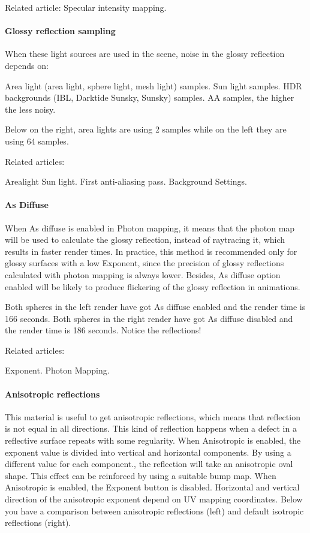 Related article: Specular intensity mapping.
\paragraph{Glossy reflection sampling}

When these light sources are used in the scene, noise in the glossy reflection depends on:

Area light (area light, sphere light, mesh light) samples.
Sun light samples.
HDR backgrounds (IBL, Darktide Sunsky, Sunsky) samples.
AA samples, the higher the less noisy.

Below on the right, area lights are using 2 samples while on the left they are using 64 samples.

Related articles:

Arealight
Sun light.
First anti-aliasing pass.
Background Settings.

\paragraph{As Diffuse}

When As diffuse is enabled in Photon mapping, it means that the photon map will be used to calculate the glossy reflection, instead of raytracing it, which results in faster render times. In practice, this method is recommended only for glossy surfaces with a low Exponent, since the precision of glossy reflections calculated with photon mapping is always lower. Besides, As diffuse option enabled will be likely to produce flickering of the glossy reflection in animations.

Both spheres in the left render have got As diffuse enabled and the render time is 166 seconds. Both spheres in the right render have got As diffuse disabled and the render time is 186 seconds. Notice the reflections!

Related articles:

Exponent.
Photon Mapping.

\paragraph{Anisotropic reflections}

This material is useful to get anisotropic reflections, which means that reflection is not equal in all directions. This kind of reflection happens when a defect in a reflective surface repeats with some regularity. When Anisotropic is enabled, the exponent value is divided into vertical and horizontal components. By using a different value for each component., the reflection will take an anisotropic oval shape. This effect can be reinforced by using a suitable bump map. When Anisotropic is enabled, the Exponent button is disabled. Horizontal and vertical direction of the anisotropic exponent depend on UV mapping coordinates. Below you have a comparison between anisotropic reflections (left) and default isotropic reflections (right).

